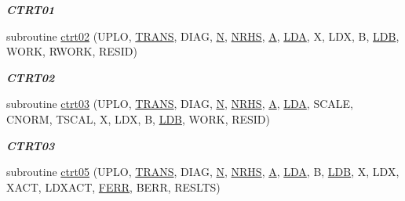 \begin{DoxyCompactItemize}
\begin{DoxyCompactList}\small\item\em {\bfseries C\+T\+R\+T01} \end{DoxyCompactList}\item 
subroutine \hyperlink{group__complex__lin_ga790116dc176de4618e10844ec8143788}{ctrt02} (U\+P\+L\+O, \hyperlink{superlu__enum__consts_8h_a0c4e17b2d5cea33f9991ccc6a6678d62a1f61e3015bfe0f0c2c3fda4c5a0cdf58}{T\+R\+A\+N\+S}, D\+I\+A\+G, \hyperlink{polmisc_8c_a0240ac851181b84ac374872dc5434ee4}{N}, \hyperlink{example__user_8c_aa0138da002ce2a90360df2f521eb3198}{N\+R\+H\+S}, \hyperlink{classA}{A}, \hyperlink{example__user_8c_ae946da542ce0db94dced19b2ecefd1aa}{L\+D\+A}, X, L\+D\+X, B, \hyperlink{example__user_8c_a50e90a7104df172b5a89a06c47fcca04}{L\+D\+B}, W\+O\+R\+K, R\+W\+O\+R\+K, R\+E\+S\+I\+D)
\begin{DoxyCompactList}\small\item\em {\bfseries C\+T\+R\+T02} \end{DoxyCompactList}\item 
subroutine \hyperlink{group__complex__lin_ga32e90acc7ede906850b2900265218e8e}{ctrt03} (U\+P\+L\+O, \hyperlink{superlu__enum__consts_8h_a0c4e17b2d5cea33f9991ccc6a6678d62a1f61e3015bfe0f0c2c3fda4c5a0cdf58}{T\+R\+A\+N\+S}, D\+I\+A\+G, \hyperlink{polmisc_8c_a0240ac851181b84ac374872dc5434ee4}{N}, \hyperlink{example__user_8c_aa0138da002ce2a90360df2f521eb3198}{N\+R\+H\+S}, \hyperlink{classA}{A}, \hyperlink{example__user_8c_ae946da542ce0db94dced19b2ecefd1aa}{L\+D\+A}, S\+C\+A\+L\+E, C\+N\+O\+R\+M, T\+S\+C\+A\+L, X, L\+D\+X, B, \hyperlink{example__user_8c_a50e90a7104df172b5a89a06c47fcca04}{L\+D\+B}, W\+O\+R\+K, R\+E\+S\+I\+D)
\begin{DoxyCompactList}\small\item\em {\bfseries C\+T\+R\+T03} \end{DoxyCompactList}\item 
subroutine \hyperlink{group__complex__lin_gab7f796d9c6c1ebeb8edfc34b3bc4e70a}{ctrt05} (U\+P\+L\+O, \hyperlink{superlu__enum__consts_8h_a0c4e17b2d5cea33f9991ccc6a6678d62a1f61e3015bfe0f0c2c3fda4c5a0cdf58}{T\+R\+A\+N\+S}, D\+I\+A\+G, \hyperlink{polmisc_8c_a0240ac851181b84ac374872dc5434ee4}{N}, \hyperlink{example__user_8c_aa0138da002ce2a90360df2f521eb3198}{N\+R\+H\+S}, \hyperlink{classA}{A}, \hyperlink{example__user_8c_ae946da542ce0db94dced19b2ecefd1aa}{L\+D\+A}, B, \hyperlink{example__user_8c_a50e90a7104df172b5a89a06c47fcca04}{L\+D\+B}, X, L\+D\+X, X\+A\+C\+T, L\+D\+X\+A\+C\+T, \hyperlink{superlu__enum__consts_8h_af00a42ecad444bbda75cde1b64bd7e72a78fd14d7abebae04095cfbe02928f153}{F\+E\+R\+R}, B\+E\+R\+R, R\+E\+S\+L\+T\+S)

\end{DoxyCompactItemize}
